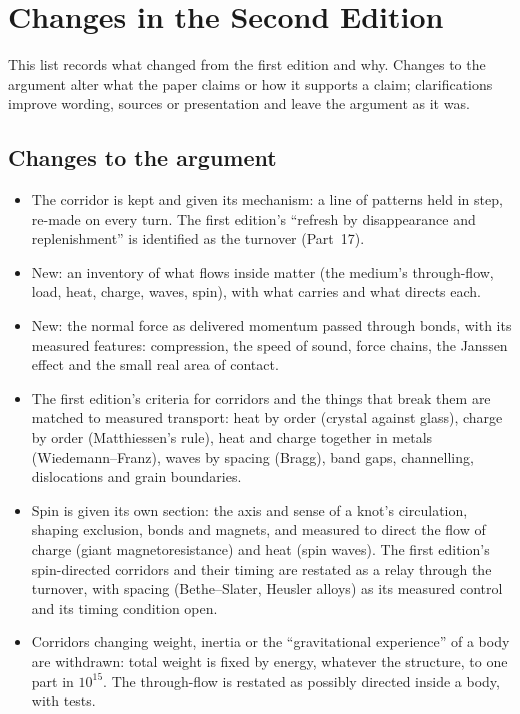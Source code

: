 \documentclass[11pt,a4paper]{article}
\begin{document}
\clearpage
\section*{Changes in the Second Edition}

This list records what changed from the first edition and why. Changes to the argument alter what the paper claims or how it supports a claim; clarifications improve wording, sources or presentation and leave the argument as it was.

\subsection*{Changes to the argument}
\begin{itemize}
\item The corridor is kept and given its mechanism: a line of patterns held in step, re-made on every turn. The first edition's ``refresh by disappearance and replenishment'' is identified as the turnover (Part~17).
\item New: an inventory of what flows inside matter (the medium's through-flow, load, heat, charge, waves, spin), with what carries and what directs each.
\item New: the normal force as delivered momentum passed through bonds, with its measured features: compression, the speed of sound, force chains, the Janssen effect and the small real area of contact.
\item The first edition's criteria for corridors and the things that break them are matched to measured transport: heat by order (crystal against glass), charge by order (Matthiessen's rule), heat and charge together in metals (Wiedemann--Franz), waves by spacing (Bragg), band gaps, channelling, dislocations and grain boundaries.
\item Spin is given its own section: the axis and sense of a knot's circulation, shaping exclusion, bonds and magnets, and measured to direct the flow of charge (giant magnetoresistance) and heat (spin waves). The first edition's spin-directed corridors and their timing are restated as a relay through the turnover, with spacing (Bethe--Slater, Heusler alloys) as its measured control and its timing condition open.
\item Corridors changing weight, inertia or the ``gravitational experience'' of a body are withdrawn: total weight is fixed by energy, whatever the structure, to one part in $10^{15}$. The through-flow is restated as possibly directed inside a body, with tests.

\end{itemize}
\end{document}
